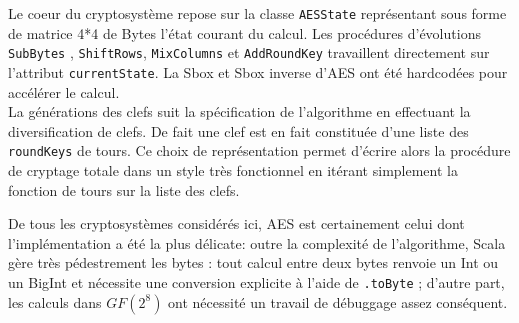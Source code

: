 \documentclass[11pt]{article} %
\begin{document}
 Le coeur du cryptosystème repose sur la classe \texttt{AESState} représentant sous forme de matrice 4*4 de Bytes l'état courant du calcul. Les procédures d'évolutions \texttt{SubBytes} , \texttt{ShiftRows}, \texttt{MixColumns} et \texttt{AddRoundKey} travaillent directement sur l'attribut \texttt{currentState}. La Sbox et Sbox inverse d'AES ont été hardcodées pour accélérer le calcul. \\

La générations des clefs suit la spécification de l'algorithme en effectuant la diversification de clefs. De fait une clef est en fait constituée d'une liste des \texttt{roundKeys} de tours.  Ce choix de représentation permet d'écrire alors la procédure de cryptage totale dans un style très fonctionnel en itérant simplement la fonction de tours sur la liste des clefs.

De tous les cryptosystèmes considérés ici, AES est certainement celui dont l'implémentation a été la plus délicate: outre la complexité de l'algorithme,  Scala gère très pédestrement les bytes : tout calcul entre deux bytes renvoie un Int ou un BigInt et nécessite une conversion explicite à l'aide de \texttt{.toByte} ; d'autre part, les calculs dans ${GF}(2^8)$ ont nécessité un travail de débuggage assez conséquent.
\end{document}
